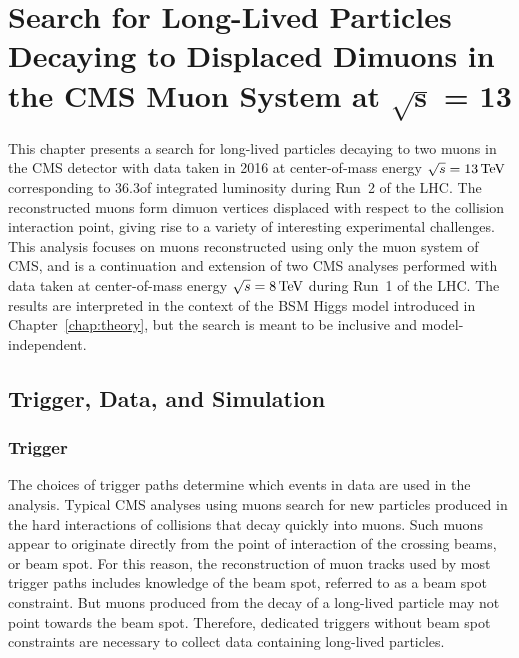 \chapter{Search for Long-Lived Particles Decaying to Displaced Dimuons in the CMS Muon System at \texorpdfstring{$\bm{\sqrt{s}}$}{\textbf{sqrt(s)}} = \texorpdfstring{13\TeV}{13~TeV}}
\label{chap:displaced}

This chapter presents a search for long-lived particles decaying to two muons in the CMS detector with data taken in 2016 at center-of-mass energy $\sqrt{s} = 13\,\text{Te\hspace{-.08em}V}$ corresponding to 36.3\fbinv of integrated luminosity during Run~2 of the LHC.
The reconstructed muons form dimuon vertices displaced with respect to the \pp collision interaction point, giving rise to a variety of interesting experimental challenges.
This analysis focuses on muons reconstructed using only the muon system of CMS, and is a continuation and extension of two CMS analyses \cite{EXO-12-037,CMS-PAS-EXO-14-012} performed with data taken at center-of-mass energy $\sqrt{s} = 8\,\text{Te\hspace{-.08em}V}$ during Run~1 of the LHC.
The results are interpreted in the context of the BSM Higgs model introduced in Chapter~\ref{chap:theory}, but the search is meant to be inclusive and model-independent.

\section{Trigger, Data, and Simulation}
\subsection{Trigger}
\label{sec:dd:Trigger}
The choices of trigger paths determine which events in data are used in the analysis.
Typical CMS analyses using muons search for new particles produced in the hard interactions of \pp collisions that decay quickly into muons.
Such muons appear to originate directly from the point of interaction of the crossing beams, or beam spot.
For this reason, the reconstruction of muon tracks used by most trigger paths includes knowledge of the beam spot, referred to as a beam spot constraint.
But muons produced from the decay of a long-lived particle may not point towards the beam spot.
Therefore, dedicated triggers without beam spot constraints are necessary to collect data containing long-lived particles.

